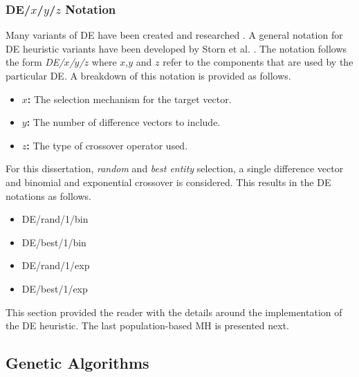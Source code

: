 \subsubsection{DE/$x$/$y$/$z$ Notation}

Many variants of \ac{DE} have been created and researched \cite{ref:mezura:2006}. A general notation for \ac{DE} heuristic variants have been developed by Storn et al. \cite{ref:storn:1996}\cite{ref:storn:1997}. The notation follows the form \textit{DE/$x$/$y$/$z$} where $x$,$y$ and $z$ refer to the components that are used by the particular \ac{DE}. A breakdown of this notation is provided as follows.

\begin{itemize}
    \item \textbf{$x$:} The selection mechanism for the target vector.
    \item \textbf{$y$:} The number of difference vectors to include.
    \item \textbf{$z$:} The type of crossover operator used.
\end{itemize}

For this dissertation, \textit{random} and \textit{best entity} selection, a single difference vector and binomial and exponential crossover is considered. This results in the \ac{DE} notations as follows.

\begin{itemize}
    \item DE/rand/1/bin
    \item DE/best/1/bin
    \item DE/rand/1/exp
    \item DE/best/1/exp
\end{itemize}

This section provided the reader with the details around the implementation of the \ac{DE} heuristic. The last population-based \ac{MH} is presented next.


\subsection{Genetic Algorithms}
\label{sec:heuristics:mh:ga}

